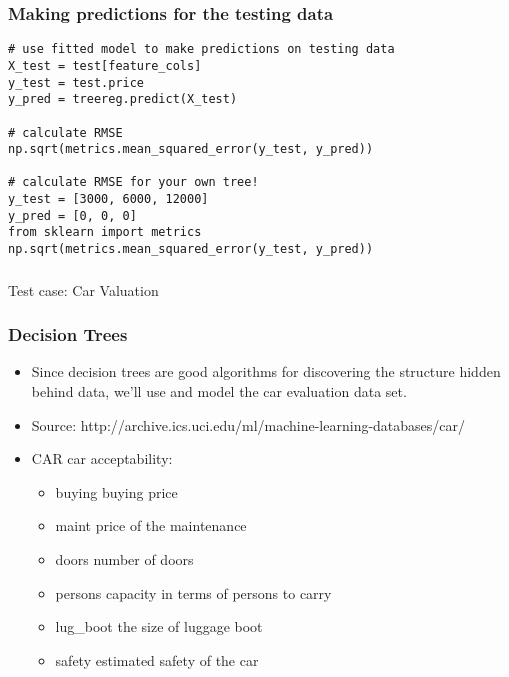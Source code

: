 \begin{frame}[fragile]\frametitle{Making predictions for the testing data}
\begin{lstlisting}
# use fitted model to make predictions on testing data
X_test = test[feature_cols]
y_test = test.price
y_pred = treereg.predict(X_test)

# calculate RMSE
np.sqrt(metrics.mean_squared_error(y_test, y_pred))

# calculate RMSE for your own tree!
y_test = [3000, 6000, 12000]
y_pred = [0, 0, 0]
from sklearn import metrics
np.sqrt(metrics.mean_squared_error(y_test, y_pred))
\end{lstlisting}

\end{frame}

\begin{frame}[fragile]\frametitle{}
\begin{center}
{\Large Test case: Car Valuation}
\end{center}
\end{frame}

\begin{frame}[fragile]\frametitle{Decision Trees}
\begin{itemize}
\item Since decision trees are good algorithms for discovering the structure hidden behind data, we'll use and model the car evaluation data set.
\item Source: http://archive.ics.uci.edu/ml/machine-learning-databases/car/
\item CAR car acceptability:
		\begin{itemize}
		\item  buying buying price
		\item  maint price of the maintenance
		\item  doors number of doors
		\item    persons capacity in terms of persons to carry
		\item   lug\_boot the size of luggage boot
		\item  safety estimated safety of the car
		\end{itemize}
\end{itemize}
\end{frame}

